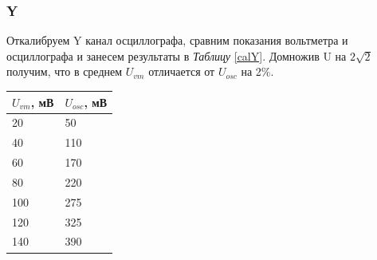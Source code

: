 \documentclass[12pt]{article}
\begin{document}
\subsubsection{Y}
\begin{minipage}{0.4\textwidth}
Откалибруем Y канал осциллографа, сравним показания вольтметра и осциллографа и занесем результаты в \textit{Таблицу} \ref{calY}. Домножив U на $2\sqrt{2}$ получим, что в среднем  $U_{vm}$ отличается от $U_{osc}$ на 2\%.
\end{minipage}
\begin{minipage}{0.6\textwidth}
\begin{center}
\begin{tabular}{|l|l|}
\hline
$U_{vm}$, мВ & $U_{osc}$, мВ \\ \hline
20          & 50            \\ \hline
40          & 110           \\ \hline
60          & 170           \\ \hline
80          & 220           \\ \hline
100         & 275           \\ \hline
120         & 325           \\ \hline
140         & 390           \\ \hline
\end{tabular}
\label{calY}
\end{center}
\end{minipage}
\end{document}
